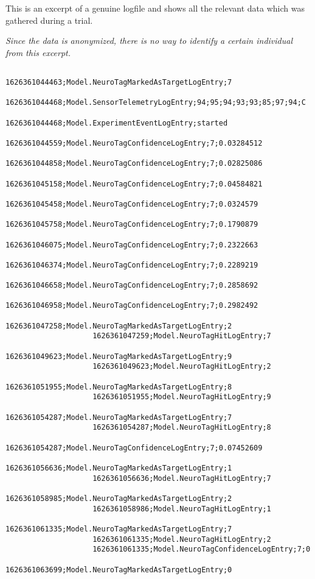                 This is an excerpt of a genuine logfile and shows all the relevant data which was gathered during a trial. 
                
                \medskip

                \textit{Since the data is anonymized, there is no way to identify a certain individual from this excerpt.}

                \begin{lstlisting}
                    1626361044463;Model.NeuroTagMarkedAsTargetLogEntry;7
                    1626361044468;Model.SensorTelemetryLogEntry;94;95;94;93;93;85;97;94;C
                    1626361044468;Model.ExperimentEventLogEntry;started
                    1626361044559;Model.NeuroTagConfidenceLogEntry;7;0.03284512
                    1626361044858;Model.NeuroTagConfidenceLogEntry;7;0.02825086
                    1626361045158;Model.NeuroTagConfidenceLogEntry;7;0.04584821
                    1626361045458;Model.NeuroTagConfidenceLogEntry;7;0.0324579
                    1626361045758;Model.NeuroTagConfidenceLogEntry;7;0.1790879
                    1626361046075;Model.NeuroTagConfidenceLogEntry;7;0.2322663
                    1626361046374;Model.NeuroTagConfidenceLogEntry;7;0.2289219
                    1626361046658;Model.NeuroTagConfidenceLogEntry;7;0.2858692
                    1626361046958;Model.NeuroTagConfidenceLogEntry;7;0.2982492
                    1626361047258;Model.NeuroTagMarkedAsTargetLogEntry;2
                    1626361047259;Model.NeuroTagHitLogEntry;7
                    1626361049623;Model.NeuroTagMarkedAsTargetLogEntry;9
                    1626361049623;Model.NeuroTagHitLogEntry;2
                    1626361051955;Model.NeuroTagMarkedAsTargetLogEntry;8
                    1626361051955;Model.NeuroTagHitLogEntry;9
                    1626361054287;Model.NeuroTagMarkedAsTargetLogEntry;7
                    1626361054287;Model.NeuroTagHitLogEntry;8
                    1626361054287;Model.NeuroTagConfidenceLogEntry;7;0.07452609
                    1626361056636;Model.NeuroTagMarkedAsTargetLogEntry;1
                    1626361056636;Model.NeuroTagHitLogEntry;7
                    1626361058985;Model.NeuroTagMarkedAsTargetLogEntry;2
                    1626361058986;Model.NeuroTagHitLogEntry;1
                    1626361061335;Model.NeuroTagMarkedAsTargetLogEntry;7
                    1626361061335;Model.NeuroTagHitLogEntry;2
                    1626361061335;Model.NeuroTagConfidenceLogEntry;7;0
                    1626361063699;Model.NeuroTagMarkedAsTargetLogEntry;0

\end{lstlisting}
